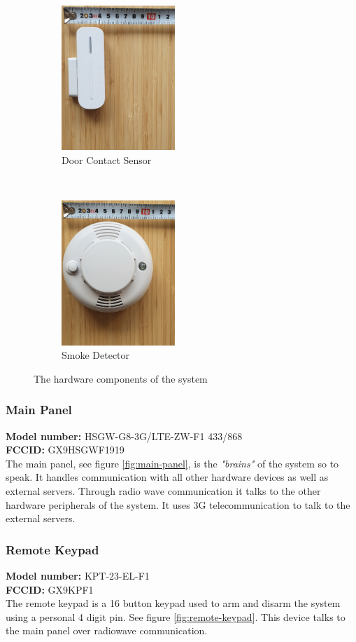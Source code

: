 \begin{figure}[!ht]
    \begin{subfigure}[t]{0.33\textwidth}
        \includegraphics[height=2.15in]{images/door-contact.png}
        \caption{Door Contact Sensor}
        \label{fig:door-contact}
    \end{subfigure}%
    ~
    \begin{subfigure}[t]{0.33\textwidth}
        \includegraphics[height=2.15in]{images/smoke-detector.png}
        \caption{Smoke Detector}
        \label{fig:smoke-detector}
    \end{subfigure}
    \caption{The hardware components of the system}
    \label{fig:hardware-components}
\end{figure}
\subsubsection{Main Panel}
\textbf{Model number:} HSGW-G8-3G/LTE-ZW-F1 433/868 \\
\textbf{FCCID:} GX9HSGWF1919 \\
The main panel, see figure \ref{fig:main-panel}, is the \textit{"brains"} of the system so to speak. It handles communication with all other hardware devices as well as external servers. Through radio wave communication it talks to the other hardware peripherals of the system. It uses 3G telecommunication to talk to the external servers.

\subsubsection{Remote Keypad}
\textbf{Model number:} KPT-23-EL-F1 \\ %
\textbf{FCCID:} GX9KPF1 \\ %
The remote keypad is a 16 button keypad used to arm and disarm the system using a personal 4 digit pin. See figure \ref{fig:remote-keypad}. This device talks to the main panel over radiowave communication.


